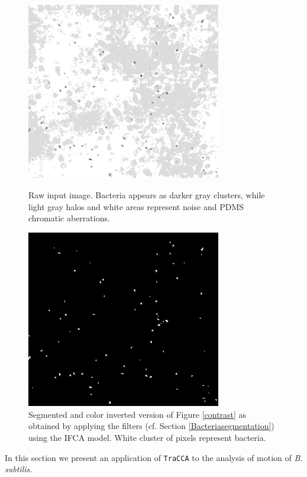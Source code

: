 \documentclass[conference]{IEEEtran}
\begin{document}
\begin{figure}
    \begin{minipage}[l]{1.0\columnwidth}
        \centering
        \includegraphics[width=8.5cm]{./images/bacteriasmall}
        \caption{Raw input image. Bacteria appears as darker gray clusters, while light gray halos and white areas represent noise and PDMS chromatic aberrations.}\label{contrast}
    \end{minipage}
    \hfill{}
    \begin{minipage}[r]{1.0\columnwidth}
        \centering
        \includegraphics[width=8.5cm]{./images/bacteriasmall_threshold}
        \caption{Segmented and color inverted version of Figure \ref{contrast} as obtained by applying the filters (cf. Section \ref{Bacteriasegmentation}) using the IFCA model. White cluster of pixels represent bacteria.}\label{BBB}
    \end{minipage}
    \vspace{-1.5em}
\end{figure}
In this section we present an application of \texttt{TraCCA} to the analysis of motion of \textit{B. subtilis.}
\end{document}
